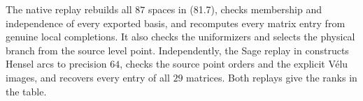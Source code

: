 The native replay  rebuilds
all $87$ spaces in (81.7), checks membership and independence of
every exported basis, and recomputes every matrix entry from genuine
local completions. It also checks the uniformizers and selects the
physical branch from the source level point. Independently, the Sage
replay in  constructs Hensel
arcs to precision $64$, checks the source point orders and the
explicit V\'{e}lu images, and recovers every entry of all $29$ matrices.
Both replays give the ranks in the table.

